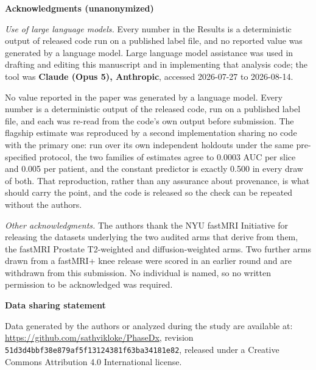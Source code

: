 \documentclass[11pt,letterpaper]{article}
\newcommand{\block}[1]{\vspace{0.5em}\textbf{#1}\par}
\begin{document}
\block{Acknowledgments (unanonymized)}

\emph{Use of large language models.} Every number in the Results is a
deterministic output of released code run on a published label file, and no
reported value was generated by a language model. Large language model
assistance was used in drafting and editing this manuscript and in implementing
that analysis code; the tool was \textbf{Claude (Opus 5), Anthropic}, accessed
2026-07-27 to 2026-08-14.

\vspace{0.2em}
No value reported in the paper was generated by a language model. Every number
is a deterministic output of the released code, run on a published label file,
and each was re-read from the code's own output before submission. The flagship
estimate was reproduced by a second implementation sharing no code with the
primary one: run over its own independent holdouts under the same pre-specified
protocol, the two families of estimates agree to 0.0003 AUC per slice and 0.005
per patient, and the constant predictor is exactly 0.500 in every draw of both.
That reproduction, rather than any assurance about provenance, is what should
carry the point, and the code is released so the check can be repeated without
the authors.

\vspace{0.3em}
\emph{Other acknowledgments.} The authors thank the NYU fastMRI Initiative for
releasing the datasets underlying the two audited arms that derive from them, the
fastMRI Prostate T2-weighted and diffusion-weighted arms. Two further arms drawn
from a fastMRI+ knee release were scored in an earlier round and are withdrawn
from this submission. No individual is named, so no written permission to be
acknowledged was required.

\block{Data sharing statement}

Data generated by the authors or analyzed during the study are available at:
\url{https://github.com/sathvikloke/PhaseDx}, revision
\texttt{51d3d4bbf38e879af5f13124381f63ba34181e82}, released under a Creative
Commons Attribution 4.0 International license.
\end{document}
